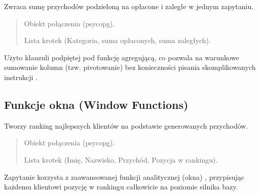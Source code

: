 \documentclass[a4paper,11pt,english,openany,oneside]{sphinxmanual}
\begin{document}
\begin{savenotes}\begin{fulllineitems}

\pysigstartsignatures
\pysiglinewithargsret
{}
{}
{}
\pysigstopsignatures
\sphinxAtStartPar
Zwraca sumę przychodów podzieloną na opłacone i zaległe w jednym zapytaniu.
\begin{quote}\begin{description}
\sphinxAtStartPar
{} \textendash{} Obiekt połączenia (psycopg).

\sphinxAtStartPar
Lista krotek (Kategoria, suma opłaconych, suma zaległych).

\end{description}\end{quote}

\sphinxAtStartPar
{} Użyto klauzuli  podpiętej pod funkcję agregującą, co pozwala na warunkowe sumowanie kolumn (tzw. pivotowanie) bez konieczności pisania skomplikowanych instrukcji .

\end{fulllineitems}\end{savenotes}



\subsection{Funkcje okna (Window Functions)}
\label{\detokenize{rozdzial_5/index:funkcje-okna-window-functions}}

\begin{savenotes}\begin{fulllineitems}

\pysigstartsignatures
\pysiglinewithargsret
{}
{}
{}
\pysigstopsignatures
\sphinxAtStartPar
Tworzy ranking najlepszych klientów na podstawie generowanych przychodów.
\begin{quote}\begin{description}
\sphinxAtStartPar
{} \textendash{} Obiekt połączenia (psycopg).

\sphinxAtStartPar
Lista krotek (Imię, Nazwisko, Przychód, Pozycja w rankingu).

\end{description}\end{quote}

\sphinxAtStartPar
{} Zapytanie korzysta z zaawansowanej funkcji analitycznej (okna) , przypisując każdemu klientowi pozycję w rankingu całkowicie na poziomie silnika bazy.

\end{fulllineitems}\end{savenotes}
\end{document}
